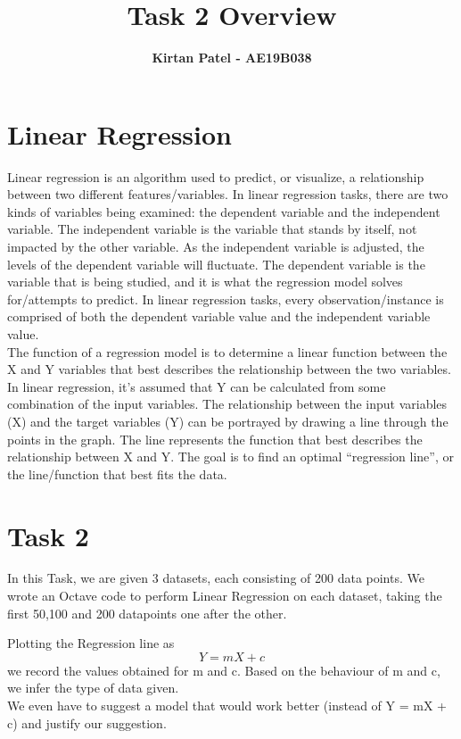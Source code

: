 \documentclass{article}
\title{\LARGE{\bf{Task 2 Overview}}}
\author{\Large{\bf{Kirtan Patel - AE19B038}}}
\date{}
\begin{document}
\maketitle 

\section{Linear Regression}
Linear regression is an algorithm used to predict, or visualize, a relationship between two different features/variables. In linear regression tasks, there are two kinds of variables being examined: the dependent variable and the independent variable. The independent variable is the variable that stands by itself, not impacted by the other variable. As the independent variable is adjusted, the levels of the dependent variable will fluctuate. The dependent variable is the variable that is being studied, and it is what the regression model solves for/attempts to predict. In linear regression tasks, every observation/instance is comprised of both the dependent variable value and the independent variable value.\\ 

The function of a regression model is to determine a linear function between the X and Y variables that best describes the relationship between the two variables. In linear regression, it’s assumed that Y can be calculated from some combination of the input variables. The relationship between the input variables (X) and the target variables (Y) can be portrayed by drawing a line through the points in the graph. The line represents the function that best describes the relationship between X and Y. The goal is to find an optimal “regression line”, or the line/function that best fits the data.

\section{Task 2}
In this Task, we are given 3 datasets, each consisting of 200 data points. We wrote an Octave code to perform Linear Regression on each dataset, taking the first 50,100 and 200 datapoints one after the other.

Plotting the Regression line as 
\[Y = mX + c\]
we record the values obtained for m and c. Based on the behaviour of m and c, we infer the type of data given.\\ 

We even have to suggest a model that would work better (instead of Y = mX + c) and justify our suggestion.
\end{document}
